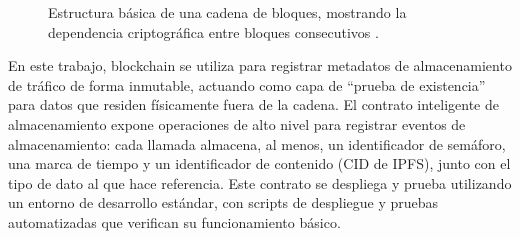 \begin{figure}[htbp]
    \centering
    \shorthandoff{>}
    \shorthandon{>}
    \caption{Estructura básica de una cadena de bloques, mostrando la dependencia criptográfica entre bloques consecutivos \cite{nakamoto2008bitcoin}.}
    \label{fig:bloque_blockchain}
\end{figure}

En este trabajo, blockchain se utiliza para registrar metadatos de almacenamiento de tráfico de forma inmutable, actuando como capa de ``prueba de existencia'' para datos que residen físicamente fuera de la cadena. El contrato inteligente de almacenamiento expone operaciones de alto nivel para registrar eventos de almacenamiento: cada llamada almacena, al menos, un identificador de semáforo, una marca de tiempo y un identificador de contenido (CID de IPFS), junto con el tipo de dato al que hace referencia. Este contrato se despliega y prueba utilizando un entorno de desarrollo estándar, con scripts de despliegue y pruebas automatizadas que verifican su funcionamiento básico.

